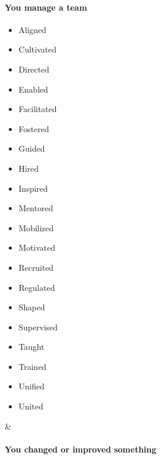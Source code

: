 \documentclass{article}
\begin{document}
\begin{longtable}
\begin{minipage}[t]{0.47\columnwidth}
{\paragraph{You manage a team}\label{you-manage-a-team}}

\begin{itemize}
\item
  Aligned
\item
  Cultivated
\item
  Directed
\item
  Enabled
\item
  Facilitated
\item
  Fostered
\item
  Guided
\item
  Hired
\item
  Inspired
\item
  Mentored
\item
  Mobilized
\item
  Motivated
\item
  Recruited
\item
  Regulated
\item
  Shaped
\item
  Supervised
\item
  Taught
\item
  Trained
\item
  Unified
\item
  United
\end{itemize}\strut
\end{minipage} & \begin{minipage}[t]{0.47\columnwidth}\raggedright
\hypertarget{you-changed-or-improved-something}{%
\paragraph{You changed or improved
something}\label{you-changed-or-improved-something}}


\end{minipage}
\end{longtable}
\end{document}

